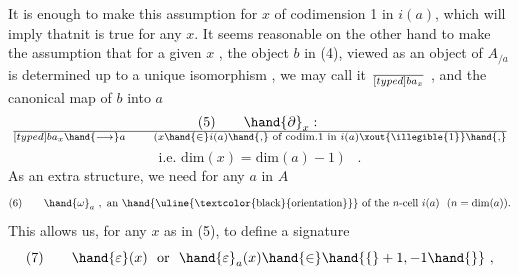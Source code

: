It is enough to make this assumption for $x$ of codimension 1 in $i(a)$,
which will imply thatnit is true for any $x$.  It seems reasonable on the
other hand to make the assumption that for a given $x$ ,  the object  $b$
in (4),  viewed as an object of  $A_{/a}$ \hand{,}  is determined up to a unique
isomorphism ,  we may call it $\over[typed]{b}{a}_{x}$ ,  and  the canonical map of $b$ into $a$
\[ (5) \qquad \hand{\partial}_{x} :\ \over[typed]{b}{a}_{x} \hand{\longrightarrow} a \qquad ( x \hand{\in} i(a)\hand{,} \text{ of codim.1 in } i(a)\xout{\illegible{1}}\hand{,} \]
\[ \text{i.e. } \mathrm{dim}(x)=\mathrm{dim}(a)-1 \ ) \quad . \]
As an extra structure,  we need for any $a$ in $A$
\[ (6) \qquad \hand{\omega}_{a} \ ,\ \text{an \hand{\uline{\textcolor{black}{orientation}}} of the $n$-cell } i(a) \ \ (n=\mathrm{dim}(a)). \]
This allows us,  for any $x$ as in (5),  to define a signature
\[ (7) \qquad \hand{\varepsilon}(x) \ \text{ or } \ \hand{\varepsilon}_{a}(x) \hand{\in} \hand{\{} +1,-1 \hand{\}} \ , \]

